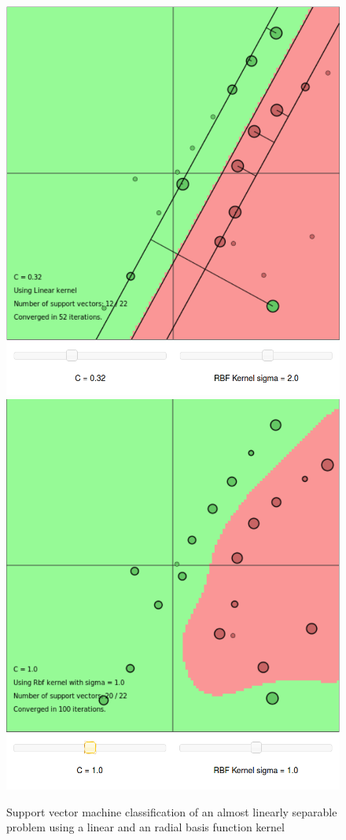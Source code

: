 \begin{figure}
\centering
\includegraphics[width=0.33\linewidth]{../src/figure/svmjsLinSep}
\includegraphics[width=0.33\linewidth]{../src/figure/svmjsLinRBF}
\caption{Support vector machine classification of an almost linearly separable problem using a linear and an radial basis function kernel}
\label{fig:svmjsLinRBF}
\end{figure}

